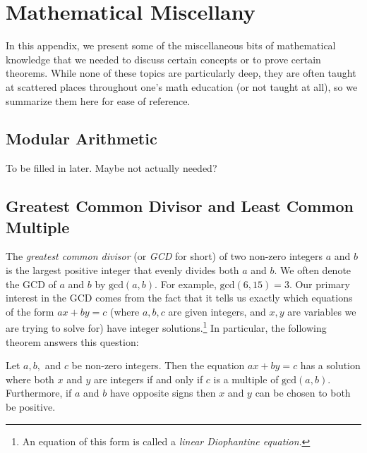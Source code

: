 \chapter{Mathematical Miscellany}\label{app:math}

In this appendix, we present some of the miscellaneous bits of mathematical knowledge that we needed to discuss certain concepts or to prove certain theorems. While none of these topics are particularly deep, they are often taught at scattered places throughout one's math education (or not taught at all), so we summarize them here for ease of reference.


\section{Modular Arithmetic}\label{sec:modular_arithmetic}

To be filled in later. Maybe not actually needed?


\section{Greatest Common Divisor and Least Common Multiple}\label{sec:gcd}

The \emph{greatest common divisor} (or \emph{GCD} for short) of two non-zero integers $a$ and $b$ is the largest positive integer that evenly divides both $a$ and $b$. We often denote the GCD of $a$ and $b$ by $\mathrm{gcd}(a,b)$. For example, $\mathrm{gcd}(6,15) = 3$. Our primary interest in the GCD comes from the fact that it tells us exactly which equations of the form $ax + by = c$ (where $a,b,c$ are given integers, and $x,y$ are variables we are trying to solve for) have integer solutions.\footnote{An equation of this form is called a \emph{linear Diophantine equation}.} In particular, the following theorem answers this question:


\begin{theorem}\label{thm:linear_diophantine}
	Let $a, b,$ and $c$ be non-zero integers. Then the equation $ax + by = c$ has a solution where both $x$ and $y$ are integers if and only if $c$ is a multiple of $\mathrm{gcd}(a,b)$. Furthermore, if $a$ and $b$ have opposite signs then $x$ and $y$ can be chosen to both be positive.
\end{theorem}

